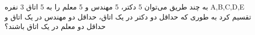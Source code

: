 \p    
به چند طریق می‌توان 5 دکتر، 5 مهندس و 5 معلم را به 5 اتاق 3 نفره A,B,C,D,E
تقسیم کرد به طوری که
حداقل دو دکتر در یک اتاق، حداقل دو مهندس در یک اتاق و حداقل دو معلم در یک اتاق باشند؟
